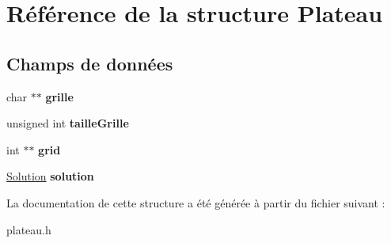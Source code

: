 \hypertarget{structPlateau}{
\section{Référence de la structure Plateau}
\label{structPlateau}
}
\subsection*{Champs de données}
\begin{DoxyCompactItemize}
\item 
\hypertarget{structPlateau_a42411aa44b78d298681030ce3461f686}{
char $\ast$$\ast$ {\bfseries grille}}
\label{structPlateau_a42411aa44b78d298681030ce3461f686}

\item 
\hypertarget{structPlateau_aa71d603afaf91ff7c81427af61919a34}{
unsigned int {\bfseries tailleGrille}}
\label{structPlateau_aa71d603afaf91ff7c81427af61919a34}

\item 
\hypertarget{structPlateau_aeb94d618db5af1b25a4f64042a4ad771}{
int $\ast$$\ast$ {\bfseries grid}}
\label{structPlateau_aeb94d618db5af1b25a4f64042a4ad771}

\item 
\hypertarget{structPlateau_aed88af50891b17edcd3ba97d7098dfde}{
\hyperlink{structSolution}{Solution} {\bfseries solution}}
\label{structPlateau_aed88af50891b17edcd3ba97d7098dfde}

\end{DoxyCompactItemize}


La documentation de cette structure a été générée à partir du fichier suivant :\begin{DoxyCompactItemize}
\item 
plateau.h\end{DoxyCompactItemize}
